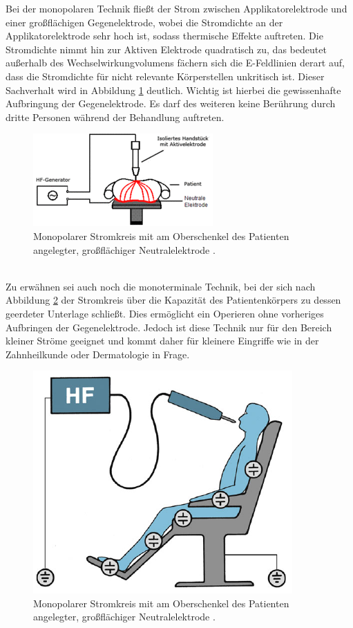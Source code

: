 \documentclass[letterpaper,12pt]{article}
\begin{document}
			Bei der monopolaren Technik fließt der Strom zwischen Applikatorelektrode und einer großflächigen Gegenelektrode, wobei die Stromdichte an der Applikatorelektrode sehr hoch ist, sodass thermische Effekte auftreten.
			Die Stromdichte nimmt hin zur Aktiven Elektrode quadratisch zu, das bedeutet außerhalb des Wechselwirkungvolumens fächern sich die E-Feldlinien derart auf, dass die Stromdichte für nicht relevante Körperstellen unkritisch ist. Dieser Sachverhalt wird in Abbildung \ref{fig:monopolareTechnik2} deutlich. Wichtig ist hierbei die gewissenhafte Aufbringung der Gegenelektrode. Es darf des weiteren keine Berührung durch dritte Personen während der Behandlung auftreten.
			\begin{figure}[h!] 
				\centering
				\includegraphics[width=0.35\columnwidth]{images/_monopolareTechnik.png}
				\caption{		 
					Monopolarer Stromkreis mit am Oberschenkel des Patienten angelegter, großflächiger Neutralelektrode \cite{wiki:HF}.}
				\label{fig:monopolareTechnik2}
			\end{figure}\\
			Zu erwähnen sei auch noch die monoterminale Technik, bei der sich nach Abbildung \ref{fig:monoterminaleTechnik} der Stromkreis über die Kapazität des Patientenkörpers zu dessen geerdeter Unterlage schließt. Dies ermöglicht ein Operieren ohne vorheriges Aufbringen der Gegenelektrode. Jedoch ist diese Technik nur für den Bereich kleiner Ströme geeignet und kommt daher für kleinere Eingriffe wie in der Zahnheilkunde oder Dermatologie in Frage. 
			\begin{figure}[h!] 
				\centering
				\includegraphics[width=0.35\columnwidth]{images/monoterminaleTechnik.png}
				\caption{		 
					Monopolarer Stromkreis mit am Oberschenkel des Patienten angelegter, großflächiger Neutralelektrode \cite{kramme2016medizintechnik}.}
				\label{fig:monoterminaleTechnik}
			\end{figure}\\
\end{document}
